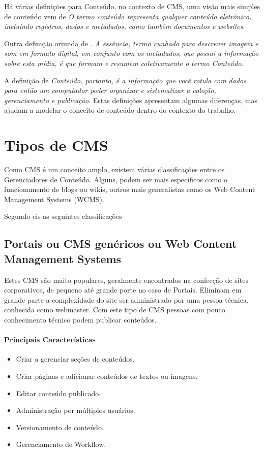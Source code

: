 Há várias definições para Conteúdo, no contexto de CMS, uma visão mais simples de conteúdo vem de \cite{ecm_paper} \emph{O termo conteúdo representa qualquer conteúdo eletrônico, incluindo registros, dados e metadados, como também documentos e websites}.  

Outra definição oriunda de \cite{thomas_cms_education}. \emph{A essência, termo cunhado para descrever imagem e som em formato digital, em conjunto com os metadados, que possui a informação sobre esta mídia, é que formam e resumem coletivamente o termo Conteúdo.}

A definição de \cite{cms_bible} \emph{Conteúdo, portanto, é a informação que você rotula com dados para então um computador poder organizar e sistematizar a coleção, gerenciamento e publicação}. Estas definições apresentam algumas diferenças, mas ajudam a modelar o conceito de conteúdo dentro do contexto do trabalho.

\section{Tipos de CMS}

Como CMS é um conceito amplo, existem várias classificações entre os Gerenciadores de Conteúdo. Alguns, podem ser mais específicos como o funcionamento de blogs ou wikis, outros mais generalistas como os Web Content Management Systems (WCMS). 

Segundo \cite{choosing_open_source_cms} eis as seguintes classificações

\subsection{Portais ou CMS genéricos ou Web Content Management Systems} 

Estes CMS são muito populares, geralmente encontrados na confecção de sites corporativos, de pequeno até grande porte no caso de Portais. Eliminam em grande parte a complexidade do site ser administrado por uma pessoa técnica, conhecida como webmaster. Com este tipo de CMS pessoas com pouco conhecimento técnico podem publicar conteúdos.

\paragraph{Principais Características}

\begin{itemize}
  \item Criar a gerenciar seções de conteúdos.
  \item Criar páginas e adicionar conteúdos de textos ou imagens.
  \item Editar conteúdo publicado.
  \item Administração por múltiplos usuários.
  \item Versionamento de conteúdo.
  \item Gerenciamento de Workflow.
\end{itemize}

